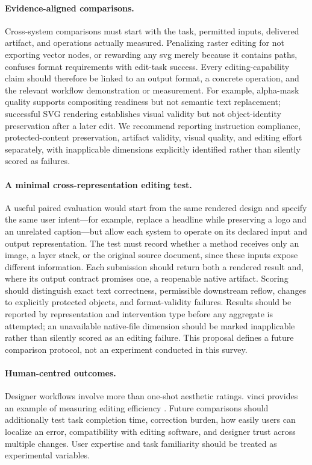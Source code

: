 \paragraph{Evidence-aligned comparisons.}
Cross-system comparisons must start with the task, permitted inputs, delivered artifact, and operations actually measured.
Penalizing raster editing for not exporting vector nodes, or rewarding any \ac{svg} merely because it contains paths, confuses format requirements with edit-task success.
Every editing-capability claim should therefore be linked to an output format, a concrete operation, and the relevant workflow demonstration or measurement.
For example, alpha-mask quality supports compositing readiness but not semantic text replacement; successful SVG rendering establishes visual validity but not object-identity preservation after a later edit.
We recommend reporting instruction compliance, protected-content preservation, artifact validity, visual quality, and editing effort separately, with inapplicable dimensions explicitly identified rather than silently scored as failures.

\paragraph{A minimal cross-representation editing test.}
A useful paired evaluation would start from the same rendered design and specify the same user intent---for example, replace a headline while preserving a logo and an unrelated caption---but allow each system to operate on its declared input and output representation.
The test must record whether a method receives only an image, a layer stack, or the original source document, since these inputs expose different information.
Each submission should return both a rendered result and, where its output contract promises one, a reopenable native artifact.
Scoring should distinguish exact text correctness, permissible downstream reflow, changes to explicitly protected objects, and format-validity failures.
Results should be reported by representation and intervention type before any aggregate is attempted; an unavailable native-file dimension should be marked inapplicable rather than silently scored as an editing failure.
This proposal defines a future comparison protocol, not an experiment conducted in this survey.

\paragraph{Human-centred outcomes.}
Designer workflows involve more than one-shot aesthetic ratings.
\ac{vinci} provides an example of measuring editing efficiency \citep{vinci2021}.
Future comparisons should additionally test task completion time, correction burden, how easily users can localize an error, compatibility with editing software, and designer trust across multiple changes.
User expertise and task familiarity should be treated as experimental variables.

